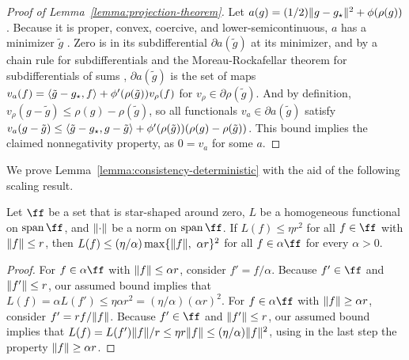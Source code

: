 \begin{proof}[Proof of Lemma~\ref{lemma:projection-theorem}]
Let $a(g) = (1/2) \lVert g - g_{\star}\rVert^2 + \phi(\rho(g))$.  
Because it is proper, convex, coercive, and lower-semicontinuous, $a$ has a minimizer $\tilde g$ \citep[Theorem 2.19]{peypouquet2015convex}.
Zero is in its subdifferential $\partial a(\tilde g)$ at its minimizer,
and by a chain rule for subdifferentials \citep[Corollary 3.5]{combari1996note} and 
the Moreau-Rockafellar theorem for subdifferentials of sums \citep[Theorem 3.30]{peypouquet2015convex},
$\partial a(\tilde g)$ is the set of maps $v_a(f) = \langle  \tilde g - g_{\star}, f\rangle + \phi'(\rho(\tilde g))v_{\rho}(f)$
for $v_{\rho} \in \partial \rho(\tilde g)$. And by definition, $v_{\rho}(g-\tilde g) \le \rho(g) - \rho(\tilde g)$,
so all functionals $v_a \in \partial a(\tilde g)$ satisfy $v_a(g-\tilde g) \le \langle\tilde g - g_{\star}, g-\tilde g\rangle + \phi'(\rho(\tilde g))(\rho(g) - \rho(\tilde g))$.
This bound implies the claimed nonnegativity property, as $0 = v_a$ for some $a$.
\end{proof}


We prove Lemma~\ref{lemma:consistency-deterministic} with the aid of the following scaling result.
\begin{lemm}
\label{lemm:rescaling}
Let $\ff$ be a set that is star-shaped around zero, $L$ be a homogeneous functional on $\vspan \ff$, 
and $\lVert\cdot\rVert$ be a norm on $\vspan \ff$. If
$L(f) \le \eta r^2$ for all $f \in \ff$ with $\lVert f\rVert \le r$, then
$L(f) \le (\eta/\alpha)\max\{\lVert f\rVert,\ \alpha r\}^2$ for all $f \in \alpha \ff$
for every $\alpha > 0$.
\end{lemm}
\begin{proof}
For $f \in \alpha \ff$ with $\lVert f\rVert \le \alpha r$, consider $f' = f/\alpha$. 
Because $f' \in \ff$ and $\lVert f'\rVert \le r$, our assumed bound implies that 
$L(f)=\alpha L(f') \le \eta \alpha r^2=(\eta/\alpha)(\alpha r)^2$.
For $f \in \alpha \ff$ with $\lVert f\rVert \ge \alpha r$, consider $f' = r f / \lVert f\rVert$.
Because $f' \in \ff$ and $\lVert f'\rVert \le r$, our assumed bound implies that 
$L(f) = L(f') \lVert f\rVert/r \le \eta  r \lVert f\rVert \le (\eta/\alpha) \lVert f\rVert^2$,
using in the last step the property $\lVert f\rVert \ge \alpha r$.
\end{proof}

